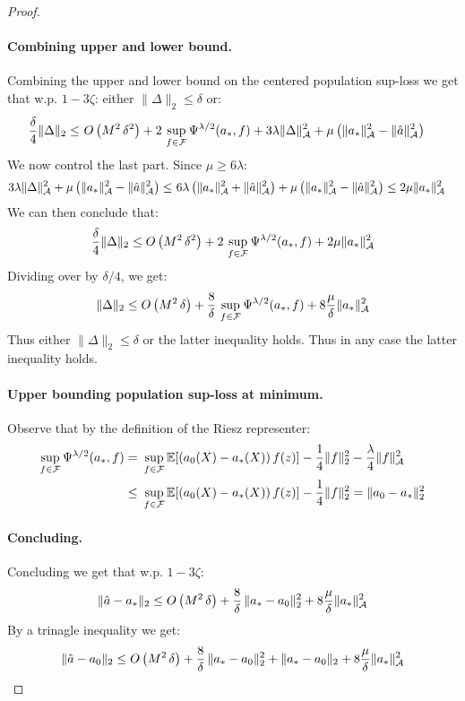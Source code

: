 \begin{proof}
\paragraph{Combining upper and lower bound.} Combining the upper and lower bound on the centered population sup-loss we get that w.p. $1-3\zeta$: either $\|\Delta\|_2\leq \delta$ or:
\begin{align}
    \frac{\delta}{4} \|\Delta\|_2 \leq~& O\left(M^2\, \delta^2\right) + 2\,\sup_{f\in {\mathcal F}} \Psi^{\lambda/2}(a_*, f) + 3\lambda \|\Delta\|_{{\mathcal A}}^2 + \mu \left(\|a_*\|_{{\mathcal A}}^2 - \|\hat{a}\|_{{\mathcal A}}^2\right)
\end{align}
We now control the last part. Since $\mu \geq 6\lambda$:
\begin{align}
    3\lambda \|\Delta\|_{{\mathcal A}}^2 + \mu \left(\|a_*\|_{{\mathcal A}}^2 - \|\hat{a}\|_{{\mathcal A}}^2\right) \leq~&  6\lambda \left(\|a_*\|_{{\mathcal A}}^2 + \|\hat{a}\|_{{\mathcal A}}^2\right) + \mu \left(\|a_*\|_{{\mathcal A}}^2 - \|\hat{a}\|_{{\mathcal A}}^2\right) \leq 2 \mu \|a_*\|_{{\mathcal A}}^2
\end{align}
We can then conclude that:
\begin{equation}
    \frac{\delta}{4} \|\Delta\|_2 \leq O\left(M^2\, \delta^2\right) + 2\,\sup_{f\in {\mathcal F}} \Psi^{\lambda/2}(a_*, f) + 2 \mu \|a_*\|_{{\mathcal A}}^2
\end{equation}
Dividing over by $\delta/4$, we get:
\begin{equation}
     \|\Delta\|_2 \leq O\left(M^2\, \delta\right) + \frac{8}{\delta}\,\sup_{f\in {\mathcal F}} \Psi^{\lambda/2}(a_*, f) + 8 \frac{\mu}{\delta} \|a_*\|_{{\mathcal A}}^2
\end{equation}
Thus either $\|\Delta\|_2\leq \delta$ or the latter inequality holds. Thus in any case the latter inequality holds.

\paragraph{Upper bounding population sup-loss at minimum.} Observe that by the definition of the Riesz representer:
\begin{align}
    \sup_{f\in {\mathcal F}} \Psi^{\lambda/2}(a_*, f) =~& \sup_{f\in {\mathcal F}} \mathbb{E}[ (a_0(X)-a_*(X))\, f(z) ] - \frac{1}{4} \|f\|_2^2 - \frac{\lambda}{4}\|f\|_{{\mathcal A}}^2\\
    \leq~& \sup_{f\in {\mathcal F}} \mathbb{E}[ (a_0(X) - a_*(X))\, f(z) ] - \frac{1}{4} \|f\|_{2}^2
    = \|a_0 - a_*\|_2^2
\end{align}

\paragraph{Concluding.} Concluding we get that w.p. $1-3\zeta$:
\begin{equation}
    \|\hat{a}-a_*\|_2 \leq O\left(M^2\, \delta\right) + \frac{8}{\delta}\, \|a_*-a_0\|_2^2 + 8 \frac{\mu}{\delta} \|a_*\|_{{\mathcal A}}^2
\end{equation}
By a trinagle inequality we get:
\begin{equation}
    \|\hat{a}-a_0\|_2 \leq O\left(M^2\, \delta\right) + \frac{8}{\delta}\, \|a_*-a_0\|_2^2 + \|a_* - a_0\|_2 + 8 \frac{\mu}{\delta} \|a_*\|_{{\mathcal A}}^2
\end{equation}


\end{proof}
